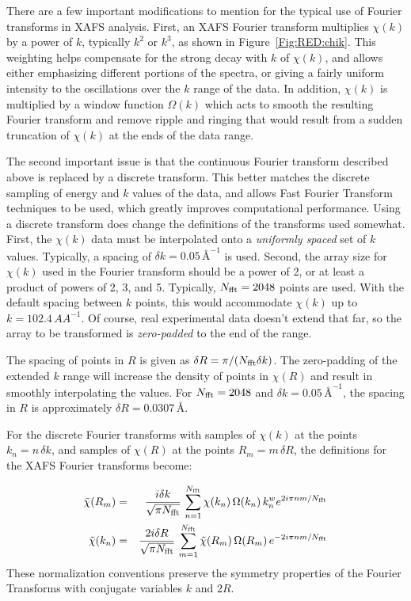 There are a few important modifications to mention for the typical use of
Fourier transforms in XAFS analysis.  First, an XAFS Fourier transform
multiplies $\chi(k)$ by a power of $k$, typically $k^2$ or $k^3$, as shown
in Figure~\ref{Fig:RED:chik}.  This weighting helps compensate for the strong
decay with $k$ of $\chi(k)$, and allows either emphasizing different
portions of the spectra, or giving a fairly uniform intensity to the
oscillations over the $k$ range of the data.  In addition, $\chi(k)$ is
multiplied by a window function $\Omega(k)$ which acts to smooth the
resulting Fourier transform and remove ripple and ringing that would result
from a sudden truncation of $\chi(k)$ at the ends of the data range.

The second important issue is that the continuous Fourier transform
described above is replaced by a discrete transform.  This better matches
the discrete sampling of energy and $k$ values of the data, and allows Fast
Fourier Transform techniques to be used, which greatly improves
computational performance.  Using a discrete transform does change the
definitions of the transforms used somewhat. First, the $\chi(k)$ data must
be interpolated onto a {\emph{uniformly spaced}} set of $k$ values.
Typically, a spacing of $\delta k = 0.05\,\text{\AA}^{-1}$ is used.
Second, the array size for $\chi(k)$ used in the Fourier transform should
be a power of 2, or at least a product of powers of 2, 3, and 5.
Typically, $N_{\rm fft} = 2048$ points are used.  With the default spacing
between $k$ points, this would accommodate $\chi(k)$ up to $k = 102.4 \,
AA^{-1}$.  Of course, real experimental data doesn't extend that far, so
the array to be transformed is {\emph{zero-padded}} to the end of the
range.

The spacing of points in $R$ is given as $\delta R = \pi/{(N_{\rm fft}
  \delta k )}$.  The zero-padding of the extended $k$ range will increase
the density of points in $\chi(R)$ and result in smoothly interpolating the
values.  For $N_{\rm fft} = 2048$ and $\delta k = 0.05\, \text{\AA}^{-1}$, the
spacing in $R$ is approximately $\delta R = 0.0307 \,\text{\AA}$.

For the discrete Fourier transforms with samples of $\chi(k)$ at the points
$k_n = n \, \delta k$, and samples of $\chi(R)$ at the points $R_m = m \,
\delta R$, the definitions for the XAFS Fourier transforms become:

\begin{eqnarray*}
  \tilde\chi(R_m) &=& \frac{i \delta k}{\sqrt{\pi N_{\rm fft}}} \,
  \sum_{n=1}^{N_{\rm fft}} \chi(k_n) \,
  \Omega(k_n) \, k_n^w e^{2i\pi n m/N_{\rm fft}} \\
  \tilde\chi(k_n) &=& \frac{2 i \delta R}{\sqrt{\pi N_{\rm fft}}} \,
  \sum_{m=1}^{N_{\rm fft}} \tilde\chi(R_m) \,
  \Omega(R_m) \, e^{-2i\pi n m/N_{\rm fft}} \\
\end{eqnarray*}
\noindent
These normalization conventions preserve the symmetry properties of the Fourier
Transforms with conjugate variables $k$ and $2R$.

